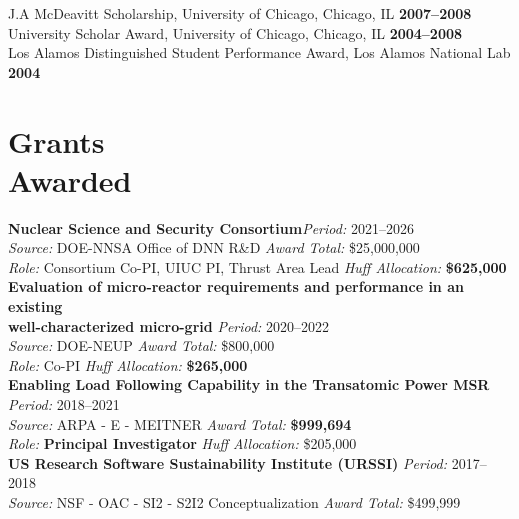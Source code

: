 \documentclass[margin,line]{resume}
\begin{document}
\begin{resume}
                J.A  McDeavitt Scholarship, University of Chicago, Chicago, IL                 \hfill\textbf{2007--2008}\vspace{.5mm}\\%
                University Scholar Award, University of Chicago, Chicago, IL                   \hfill\textbf{2004--2008}\vspace{.5mm}\\%
                Los Alamos Distinguished Student Performance Award, Los Alamos National Lab                         \hfill\textbf{2004}%
    \section{\mysidestyle Grants\\Awarded}
    \textbf{Nuclear Science and Security Consortium}\hfill\textsl{Period:} 2021--2026\\
    \textsl{Source:} DOE-NNSA Office of DNN R\&D \hfill \textsl{Award Total:} \$25,000,000\\
    \textsl{Role:} Consortium Co-PI, UIUC PI, Thrust Area Lead \hfill \textsl{Huff Allocation:} \textbf{\$625,000}\vspace{2mm}\\%
    \textbf{Evaluation of micro-reactor requirements and performance in an 
    existing \\
    well-characterized micro-grid} \hfill \textsl{Period:} 2020--2022\\
    \textsl{Source:} DOE-NEUP \hfill \textsl{Award Total:} \$800,000\\
    \textsl{Role:} Co-PI \hfill \textsl{Huff Allocation:} \textbf{\$265,000}\vspace{2mm}\\%
    \textbf{Enabling Load Following Capability in the Transatomic Power MSR} \hfill \textsl{Period:}
    2018--2021\\
    \textsl{Source:} ARPA - E - MEITNER \hfill \textsl{Award Total:} \textbf{\$999,694}\\
    \textsl{Role:} \textbf{Principal Investigator} \hfill \textsl{Huff Allocation:} \$205,000\vspace{2mm}\\%
    \textbf{US Research Software Sustainability Institute (URSSI)} \hfill \textsl{Period:}
    2017--2018\\
    \textsl{Source:} NSF - OAC - SI2 - S2I2 Conceptualization \hfill \textsl{Award Total:} \$499,999\\

\end{resume}
\end{document}
